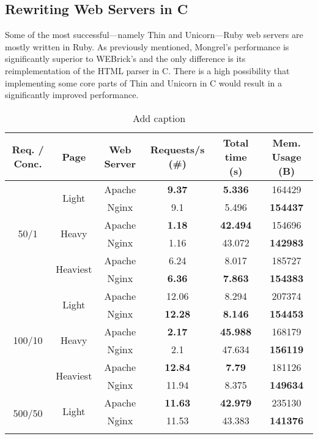 \subsection{Rewriting Web Servers in C}
Some of the most successful---namely Thin and Unicorn---Ruby web servers are mostly written in Ruby. As previously mentioned, Mongrel's performance is significantly superior to WEBrick's and the only difference is its reimplementation of the HTML parser in C. There is a high possibility that implementing some core parts of Thin and Unicorn in C would result in a significantly improved performance.


\begin{table}[htbp]
  \centering
  \caption{Add caption}
  \begin{tabular}{|c|c|c|c|c|c|}
  \hline
  Req. / Conc. & Page & Web Server & Requests/s (\#) & Total time (s) & Mem. Usage (B) \\ \hline
\multirow{6}{*}{50/1} & \multirow{2}{*}{Light} & Apache & \textbf{9.37} & \textbf{5.336} & 164429\\\cline{3-6}
 &  & Nginx & 9.1 & 5.496 & \textbf{154437}\\\cline{2-6}
 & \multirow{2}{*}{Heavy} & Apache & \textbf{1.18} & \textbf{42.494} & 154696\\\cline{3-6}
 &  & Nginx & 1.16 & 43.072 & \textbf{142983}\\\cline{2-6}
 & \multirow{2}{*}{Heaviest} & Apache & 6.24 & 8.017 & 185727\\\cline{3-6}
 &  & Nginx & \textbf{6.36} & \textbf{7.863} & \textbf{154383}\\\hline
\multirow{6}{*}{100/10} & \multirow{2}{*}{Light} & Apache & 12.06 & 8.294 & 207374\\\cline{3-6}
 &  & Nginx & \textbf{12.28} & \textbf{8.146} & \textbf{154453}\\\cline{2-6}
 & \multirow{2}{*}{Heavy} & Apache & \textbf{2.17} & \textbf{45.988} & 168179\\\cline{3-6}
 &  & Nginx & 2.1 & 47.634 & \textbf{156119}\\\cline{2-6}
 & \multirow{2}{*}{Heaviest} & Apache & \textbf{12.84} & \textbf{7.79} & 181126\\\cline{3-6}
 &  & Nginx & 11.94 & 8.375 & \textbf{149634}\\\hline
\multirow{6}{*}{500/50} & \multirow{2}{*}{Light} & Apache & \textbf{11.63} & \textbf{42.979} & 235130\\\cline{3-6}
 &  & Nginx & 11.53 & 43.383 & \textbf{141376}\\\cline{2-6}

\end{tabular}
\end{table}

